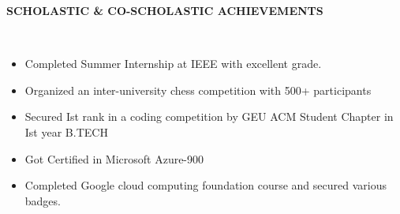 \documentclass[a4paper,10pt]{article}
\newcommand{\lsep}{-0.5cm}
\newcommand{\resheading}[1]{{\small \colorbox{mygrey}{\begin{minipage}{0.975\textwidth}{\textbf{#1 \vphantom{p\^{E}}}}\end{minipage}}}}
\begin{document}
\resheading{\textbf{SCHOLASTIC \& CO-SCHOLASTIC ACHIEVEMENTS} }\\[\lsep]
\begin{itemize}
\setlength\itemsep{0em}
\item \noindent Completed Summer Internship at IEEE with excellent grade.
\item \noindent Organized an inter-university chess competition with 500+ participants
\item \noindent Secured Ist rank in a coding competition by GEU ACM Student Chapter in Ist year B.TECH
\item \noindent Got Certified in Microsoft Azure-900
\item \noindent Completed Google cloud computing foundation course and secured various badges.
\end{itemize}
\end{document}
